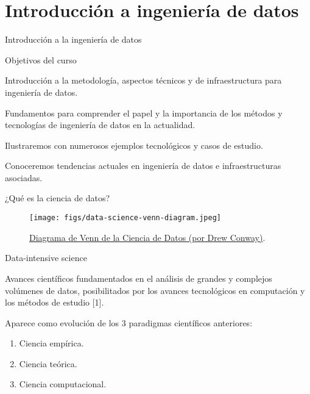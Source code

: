 %
%
%
\section{Introducción a ingeniería de datos}

\begin{frame}{}
\begin{center}
 \huge Introducción a la ingeniería de datos
\end{center}
\end{frame}


\begin{frame}{Objetivos del curso}
\begin{wideitemize}
 \item Introducción a la metodología, aspectos técnicos y de infraestructura para 
 ingeniería de datos.
 \item  Fundamentos para comprender el papel y la importancia  de los métodos
 y tecnologías de ingeniería de datos en la actualidad.
 \item Ilustraremos con numerosos ejemplos tecnológicos y casos de estudio.
 \item Conoceremos tendencias actuales en ingeniería de datos e infraestructuras
 asociadas.
\end{wideitemize}
\end{frame}


\begin{frame}{¿Qué es la ciencia de datos?}
\begin{figure}[h]
\centering
\texttt{[image: figs/data-science-venn-diagram.jpeg]} 
\caption{\href{http://drewconway.com/zia/2013/3/26/the-data-science-venn-diagram}
{Diagrama de Venn de la Ciencia de Datos (por Drew Conway)}.}
\end{figure}
 
\end{frame}


\begin{frame}{Data-intensive science}
 \begin{wideitemize}
  \item Avances científicos fundamentados en el análisis de grandes y complejos volúmenes de
  datos, posibilitados por los avances tecnológicos en computación y los métodos
  de estudio [1].
  
  \item Aparece como evolución de los 3 paradigmas científicos anteriores:
  \begin{enumerate}
   \item Ciencia empírica.
   \item Ciencia teórica.
   \item Ciencia computacional.
  \end{enumerate}


 \end{wideitemize}

\end{frame}

